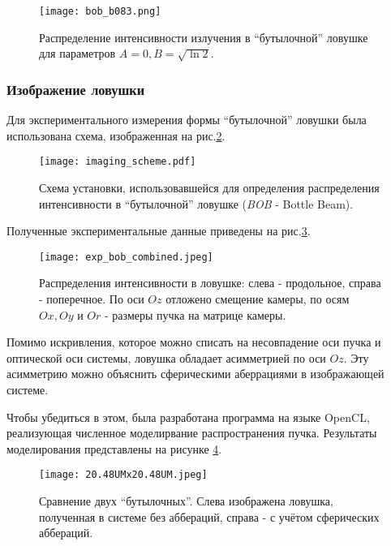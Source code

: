 \documentclass[12pt]{article}
\begin{document}
        \begin{figure}
            \center
            \texttt{[image: bob\_b083.png]}
            \caption{Распределение интенсивности излучения в \enquote{бутылочной} ловушке для параметров
            $A = 0, B = \sqrt{\ln2}$.}
            \label{fig:BOB a=0 b=sqrt(ln2)}
        \end{figure}

        \subsubsection{Изображение ловушки}
        
        Для экспериментального измерения формы \enquote{бутылочной} ловушки была использована схема,
        изображенная на рис.\ref{fig:BOB form measurement}.
        \begin{figure}
            \center
            \texttt{[image: imaging\_scheme.pdf]}
            \caption{Схема установки, использовавшейся для определения распределения интенсивности в
            \enquote{бутылочной} ловушке (\textit{BOB} - Bottle Beam).}
            \label{fig:BOB form measurement}
        \end{figure}
        Полученные экспериментальные данные приведены на рис.\ref{fig:exp BOB form}.
        \begin{figure}
            \center
            \texttt{[image: exp\_bob\_combined.jpeg]}
            \caption{Распределения интенсивности в ловушке: слева - продольное, справа - поперечное.
            По оси $Oz$ отложено смещение камеры, по осям $Ox, Oy$ и $Or$ - размеры пучка на
            матрице камеры.}
            \label{fig:exp BOB form}
        \end{figure}
        Помимо искривления, которое можно списать на несовпадение оси пучка и оптической оси системы,
        ловушка обладает асимметрией по оси $Oz$. Эту асимметрию можно объяснить сферическими
        аберрациями в изображающей системе.
        
Чтобы убедиться в этом, была разработана программа на языке OpenCL, реализующая численное
        моделирвание распространения пучка. Результаты моделирования представлены на рисунке
        \ref{fig:abber compare}.

        \begin{figure}
            \center
            \texttt{[image: 20.48UMx20.48UM.jpeg]}
            \caption{Сравнение двух \enquote{бутылочных}. Слева изображена ловушка, полученная в системе
            без аббераций, справа - с учётом сферических аббераций.}
            \label{fig:abber compare}
        \end{figure}
\end{document}
